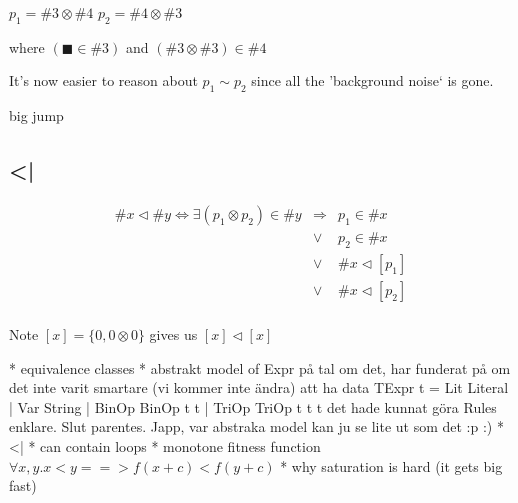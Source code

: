 $p_1 = \#3 \otimes \#4$
$p_2 = \#4 \otimes \#3$

where $(\blacksquare \in \#3)$ and $(\#3 \otimes \#3) \in \#4$

It's now easier to reason about $p_1 \sim p_2$ since all the 'background noise` is gone.


big jump


\subsection{<|}

\begin{equation*}
\begin{aligned}
\#x \lhd \#y \Leftrightarrow \exists (p_1 \otimes p_2) \in \#y &\Rightarrow& p_1 \in \#x \\
&\vee& p_2 \in \#x \\
&\vee& \#x \lhd [p_1] \\
&\vee& \#x \lhd [p_2] \\
\end{aligned}
\end{equation*}

Note $[x] = \{0, 0 \otimes 0\}$ gives us $[x] \lhd [x]$


* equivalence classes
* abstrakt model of Expr
på tal om det, har funderat på om det inte varit smartare (vi kommer inte ändra)
att ha data TExpr t = Lit Literal | Var String | BinOp BinOp t t | TriOp TriOp t t t
det hade kunnat göra Rules enklare. Slut parentes. Japp, var abstraka model kan ju se lite ut som det :p
:)
* <|
  * can contain loops
* monotone fitness function $\forall x,y. x < y ==> f (x + c) < f (y + c)$
* why saturation is hard (it gets big fast)


